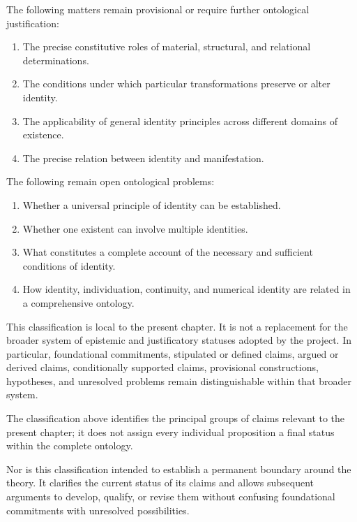 The following matters remain provisional or require
further ontological justification:

\begin{enumerate}
    \item The precise constitutive roles of material,
    structural, and relational determinations.

    \item The conditions under which particular
    transformations preserve or alter identity.

    \item The applicability of general identity principles
    across different domains of existence.

    \item The precise relation between identity and
    manifestation.
\end{enumerate}

The following remain open ontological problems:

\begin{enumerate}
    \item Whether a universal principle of identity
    can be established.

    \item Whether one existent can involve multiple
    identities.

    \item What constitutes a complete account of the
    necessary and sufficient conditions of identity.

    \item How identity, individuation, continuity,
    and numerical identity are related in a
    comprehensive ontology.
\end{enumerate}

This classification is local to the present chapter.
It is not a replacement for the broader system of
epistemic and justificatory statuses adopted by the
project. In particular, foundational commitments,
stipulated or defined claims, argued or derived claims,
conditionally supported claims, provisional constructions,
hypotheses, and unresolved problems remain distinguishable
within that broader system.

The classification above identifies the principal
groups of claims relevant to the present chapter; it
does not assign every individual proposition a final
status within the complete ontology.

Nor is this classification intended to establish a
permanent boundary around the theory. It clarifies
the current status of its claims and allows subsequent
arguments to develop, qualify, or revise them without
confusing foundational commitments with unresolved
possibilities.

